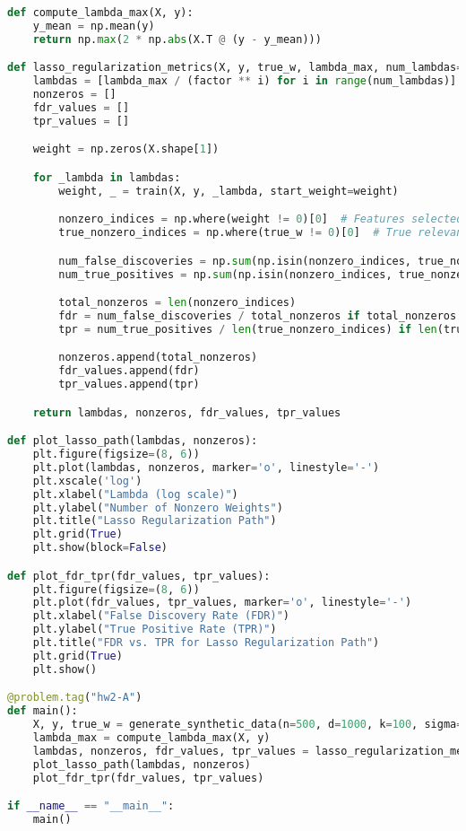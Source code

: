 \documentclass{article}
\begin{document}
\begin{lstlisting}[language=Python]
def compute_lambda_max(X, y):
    y_mean = np.mean(y)
    return np.max(2 * np.abs(X.T @ (y - y_mean)))

def lasso_regularization_metrics(X, y, true_w, lambda_max, num_lambdas=10, factor=2):
    lambdas = [lambda_max / (factor ** i) for i in range(num_lambdas)]
    nonzeros = []
    fdr_values = []
    tpr_values = []

    weight = np.zeros(X.shape[1])

    for _lambda in lambdas:
        weight, _ = train(X, y, _lambda, start_weight=weight)

        nonzero_indices = np.where(weight != 0)[0]  # Features selected by Lasso
        true_nonzero_indices = np.where(true_w != 0)[0]  # True relevant features

        num_false_discoveries = np.sum(np.isin(nonzero_indices, true_nonzero_indices, invert=True))
        num_true_positives = np.sum(np.isin(nonzero_indices, true_nonzero_indices))

        total_nonzeros = len(nonzero_indices)
        fdr = num_false_discoveries / total_nonzeros if total_nonzeros > 0 else 0
        tpr = num_true_positives / len(true_nonzero_indices) if len(true_nonzero_indices) > 0 else 0

        nonzeros.append(total_nonzeros)
        fdr_values.append(fdr)
        tpr_values.append(tpr)

    return lambdas, nonzeros, fdr_values, tpr_values

def plot_lasso_path(lambdas, nonzeros):
    plt.figure(figsize=(8, 6))
    plt.plot(lambdas, nonzeros, marker='o', linestyle='-')
    plt.xscale('log')
    plt.xlabel("Lambda (log scale)")
    plt.ylabel("Number of Nonzero Weights")
    plt.title("Lasso Regularization Path")
    plt.grid(True)
    plt.show(block=False)

def plot_fdr_tpr(fdr_values, tpr_values):
    plt.figure(figsize=(8, 6))
    plt.plot(fdr_values, tpr_values, marker='o', linestyle='-')
    plt.xlabel("False Discovery Rate (FDR)")
    plt.ylabel("True Positive Rate (TPR)")
    plt.title("FDR vs. TPR for Lasso Regularization Path")
    plt.grid(True)
    plt.show()

@problem.tag("hw2-A")
def main():
    X, y, true_w = generate_synthetic_data(n=500, d=1000, k=100, sigma=1)
    lambda_max = compute_lambda_max(X, y)
    lambdas, nonzeros, fdr_values, tpr_values = lasso_regularization_metrics(X, y, true_w, lambda_max)
    plot_lasso_path(lambdas, nonzeros)
    plot_fdr_tpr(fdr_values, tpr_values)

if __name__ == "__main__":
    main()
\end{lstlisting}
\end{document}
